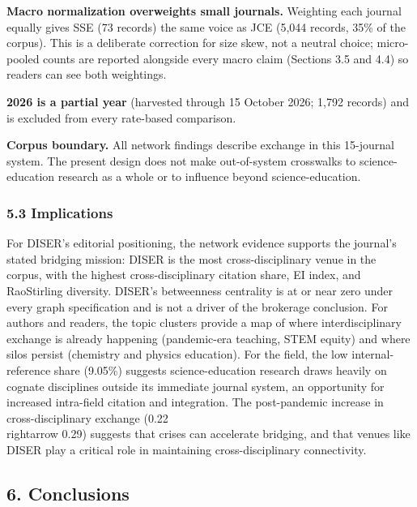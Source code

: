 \documentclass[pdflatex,sn-apa]{sn-jnl}
\begin{document}
\textbf{Macro normalization overweights small journals.} Weighting each
journal equally gives SSE (73 records) the same voice as JCE (5,044
records, 35\% of the corpus). This is a deliberate correction for size
skew, not a neutral choice; micro-pooled counts are reported alongside
every macro claim (Sections 3.5 and 4.4) so readers can see both
weightings.

\textbf{2026 is a partial year} (harvested through 15 October 2026;
1,792 records) and is excluded from every rate-based comparison.

\textbf{Corpus boundary.} All network findings describe exchange in this
15-journal system. The present design does not make out-of-system
crosswalks to science-education research as a whole or to influence
beyond science-education.

\subsubsection{5.3 Implications}\label{implications}

For DISER's editorial positioning, the network evidence supports the
journal's stated bridging mission: DISER is the most cross-disciplinary
venue in the corpus, with the highest cross-disciplinary citation share,
EI index, and RaoStirling diversity. DISER's betweenness centrality is
at or near zero under every graph specification and is not a driver of
the brokerage conclusion. For authors and readers, the topic clusters
provide a map of where interdisciplinary exchange is already happening
(pandemic-era teaching, STEM equity) and where silos persist (chemistry
and physics education). For the field, the low internal-reference share
(9.05\%) suggests science-education research draws heavily on cognate
disciplines outside its immediate journal system, an opportunity for
increased intra-field citation and integration. The post-pandemic
increase in cross-disciplinary exchange (0.22 \\rightarrow 0.29) suggests that
crises can accelerate bridging, and that venues like DISER play a
critical role in maintaining cross-disciplinary connectivity.

\subsection{6. Conclusions}\label{conclusions}
\end{document}
